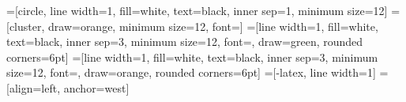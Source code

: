 \documentclass{article}
\begin{document}
    

=[circle, line width=1, fill=white, text=black, inner sep=1, minimum size=12]
=[cluster, draw=orange, minimum size=12, font=\small]
=[line width=1, fill=white, text=black, inner sep=3, minimum size=12, font=\small, draw=green, rounded corners=6pt]
=[line width=1, fill=white, text=black, inner sep=3, minimum size=12, font=\small, draw=orange, rounded corners=6pt]
=[-latex, line width=1]
 = [align=left, anchor=west]

\newcommand{\DRAWBUCKET}[3]{
    \path[line width=3, draw=black!50!white, fill=black!20!white] (#1,#2) ++(-1,1) -- ++(0,-2) -- ++(2,0) -- ++(0,2);
    \path[fill=black!50!white] (#1,#2) ++ (-1,-1) rectangle ++(2,.5);
    \draw (#1,#2) ++(0,-.75) node[align=center, text=white]{$b_#3$};
}
\end{document}
